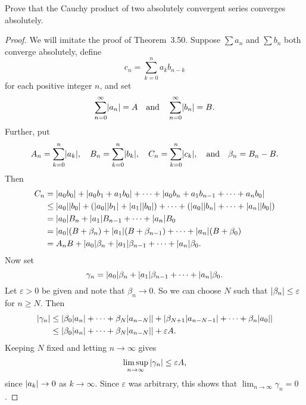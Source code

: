  Prove that the Cauchy product of two absolutely
convergent series converges absolutely.
\begin{proof}
  We will imitate the proof of Theorem~3.50. Suppose $\sum a_n$ and
  $\sum b_n$ both converge absolutely, define
  \begin{equation*}
    c_n = \sum_{k=0}^n a_kb_{n-k}
  \end{equation*}
  for each positive integer $n$, and set
  \begin{equation*}
    \sum_{n=0}^\infty\lvert{a_n}\rvert = A
    \quad\text{and}\quad
    \sum_{n=0}^\infty\lvert{b_n}\rvert = B.
  \end{equation*}
  Further, put
  \begin{equation*}
    A_n = \sum_{k=0}^n\lvert{a_k}\rvert,
    \quad
    B_n = \sum_{k=0}^n\lvert{b_k}\rvert,
    \quad
    C_n = \sum_{k=0}^n\lvert{c_k}\rvert,
    \quad\text{and}\quad
    \beta_n = B_n - B.
  \end{equation*}
  Then
  \begin{align*}
    C_n &= \lvert{a_0b_0}\rvert + \lvert{a_0b_1 + a_1b_0}\rvert
          + \cdots + \lvert{a_0b_n + a_1b_{n-1} + \cdots + a_nb_0}\rvert \\
        &\leq \lvert{a_0}\rvert\lvert{b_0}\rvert + (\lvert{a_0}\rvert\lvert{b_1}\rvert
          + \lvert{a_1}\rvert\lvert{b_0}\rvert) + \cdots + (\lvert{a_0}\rvert\lvert{b_n}\rvert
          + \cdots + \lvert{a_n}\rvert\lvert{b_0}\rvert) \\
        &= \lvert{a_0}\rvert B_n + \lvert{a_1}\rvert B_{n-1} + \cdots + \lvert{a_n}\rvert B_0 \\
        &= \lvert{a_0}\rvert(B + \beta_n) + \lvert{a_1}\rvert(B + \beta_{n-1})
          + \cdots + \lvert{a_n}\rvert(B + \beta_0) \\
        &= A_nB + \lvert{a_0}\rvert\beta_n + \lvert{a_1}\rvert\beta_{n-1}
          + \cdots + \lvert{a_n}\rvert\beta_0.
  \end{align*}
  Now set
  \begin{equation*}
    \gamma_n = \lvert{a_0}\rvert\beta_n + \lvert{a_1}\rvert\beta_{n-1}
    + \cdots + \lvert{a_n}\rvert\beta_0.
  \end{equation*}
  Let $\varepsilon > 0$ be given and note that $\beta_n\to0$. So we
  can choose $N$ such that $\lvert{\beta_n}\rvert\leq\varepsilon$ for
  $n\geq N$. Then
  \begin{align*}
    \lvert{\gamma_n}\rvert
    &\leq \lvert{\beta_0\lvert{a_n}\rvert + \cdots + \beta_N\lvert{a_{n-N}}\rvert}\rvert
      + \lvert{\beta_{N+1}\lvert{a_{n-N-1}}\rvert + \cdots + \beta_n\lvert{a_0}\rvert}\rvert \\
    &\leq \lvert{\beta_0\lvert{a_n}\rvert + \cdots + \beta_N\lvert{a_{n-N}}\rvert}\rvert
      + \varepsilon A.
  \end{align*}
  Keeping $N$ fixed and letting $n\to\infty$ gives
  \begin{equation*}
    \limsup_{n\to\infty}\,\lvert{\gamma_n}\rvert\leq\varepsilon A,
  \end{equation*}
  since $\lvert{a_k}\rvert\to0$ as $k\to\infty$. Since $\varepsilon$ was
  arbitrary, this shows that $\lim_{n\to\infty}\gamma_n = 0$.


\end{proof}

